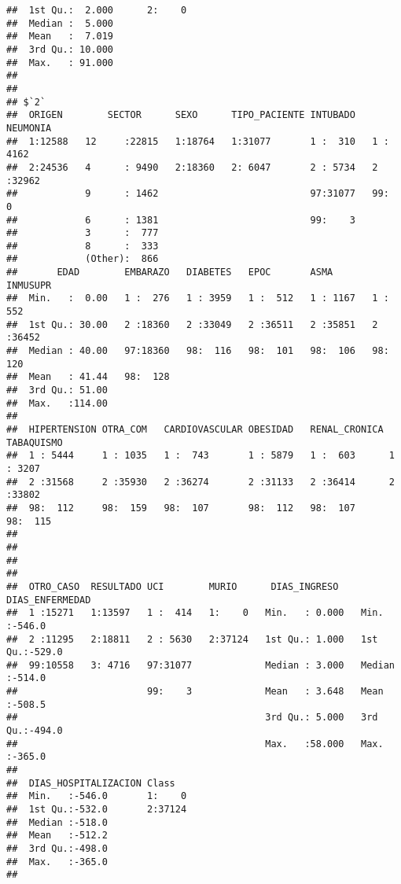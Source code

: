 \documentclass[]{article}
\begin{document}
\begin{verbatim}
##  1st Qu.:  2.000      2:    0  
##  Median :  5.000               
##  Mean   :  7.019               
##  3rd Qu.: 10.000               
##  Max.   : 91.000               
##                                
## 
## $`2`
##  ORIGEN        SECTOR      SEXO      TIPO_PACIENTE INTUBADO   NEUMONIA  
##  1:12588   12     :22815   1:18764   1:31077       1 :  310   1 : 4162  
##  2:24536   4      : 9490   2:18360   2: 6047       2 : 5734   2 :32962  
##            9      : 1462                           97:31077   99:    0  
##            6      : 1381                           99:    3             
##            3      :  777                                                
##            8      :  333                                                
##            (Other):  866                                                
##       EDAD        EMBARAZO   DIABETES   EPOC       ASMA       INMUSUPR  
##  Min.   :  0.00   1 :  276   1 : 3959   1 :  512   1 : 1167   1 :  552  
##  1st Qu.: 30.00   2 :18360   2 :33049   2 :36511   2 :35851   2 :36452  
##  Median : 40.00   97:18360   98:  116   98:  101   98:  106   98:  120  
##  Mean   : 41.44   98:  128                                              
##  3rd Qu.: 51.00                                                         
##  Max.   :114.00                                                         
##                                                                         
##  HIPERTENSION OTRA_COM   CARDIOVASCULAR OBESIDAD   RENAL_CRONICA TABAQUISMO
##  1 : 5444     1 : 1035   1 :  743       1 : 5879   1 :  603      1 : 3207  
##  2 :31568     2 :35930   2 :36274       2 :31133   2 :36414      2 :33802  
##  98:  112     98:  159   98:  107       98:  112   98:  107      98:  115  
##                                                                            
##                                                                            
##                                                                            
##                                                                            
##  OTRO_CASO  RESULTADO UCI        MURIO      DIAS_INGRESO    DIAS_ENFERMEDAD 
##  1 :15271   1:13597   1 :  414   1:    0   Min.   : 0.000   Min.   :-546.0  
##  2 :11295   2:18811   2 : 5630   2:37124   1st Qu.: 1.000   1st Qu.:-529.0  
##  99:10558   3: 4716   97:31077             Median : 3.000   Median :-514.0  
##                       99:    3             Mean   : 3.648   Mean   :-508.5  
##                                            3rd Qu.: 5.000   3rd Qu.:-494.0  
##                                            Max.   :58.000   Max.   :-365.0  
##                                                                             
##  DIAS_HOSPITALIZACION Class    
##  Min.   :-546.0       1:    0  
##  1st Qu.:-532.0       2:37124  
##  Median :-518.0                
##  Mean   :-512.2                
##  3rd Qu.:-498.0                
##  Max.   :-365.0                
## 
\end{verbatim}
\end{document}
